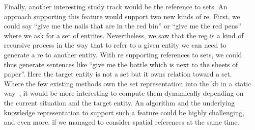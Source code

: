 Finally, another interesting study track would be the reference to sets. An approach supporting this feature would support two new kinds of \acrshort{re}. First, we could say ``give me the nails that are in the red bin'' or ``give me the red pens'' where we ask for a set of entities. Nevertheless, we saw that the \acrshort{reg} is a kind of recursive process in the way that to refer to a given entity we can need to generate a \acrshort{re} to another entity. With \acrshort{re} supporting references to sets, we could thus generate sentences like ``give me the bottle which is next to the sheets of paper''. Here the target entity is not a set but it owns relation toward a set. Where the few existing methods own the set representation into the \acrlong{kb} in a static way~\cite{fang_2013_towards}, it would be more interesting to compute them dynamically depending on the current situation and the target entity. An algorithm and the underlying knowledge representation to support such a feature could be highly challenging, and even more, if we managed to consider spatial references at the same time.
